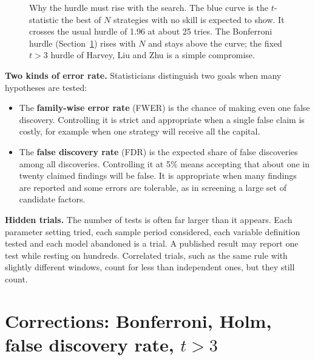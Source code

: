 \begin{figure}[htbp]
  \caption{Why the hurdle must rise with the search. The blue curve is the
    $t$-statistic the best of $N$ strategies with no skill is expected to show.
    It crosses the usual hurdle of 1.96 at about 25 tries. The Bonferroni
    hurdle (Section~\ref{sec:04-corrections}) rises with $N$ and stays above
    the curve; the fixed $t > 3$ hurdle of Harvey, Liu and Zhu is a simple
    compromise.}
  \label{fig:04-hurdles}
\end{figure}


\textbf{Two kinds of error rate.} Statisticians distinguish two goals when many hypotheses are tested:

\begin{itemize}
  \item The \textbf{family-wise error rate} (FWER) is the chance of making even one false discovery. Controlling it is strict and appropriate when a single false claim is costly, for example when one strategy will receive all the capital.
  \item The \textbf{false discovery rate} (FDR) is the expected share of false discoveries among all discoveries. Controlling it at 5\% means accepting that about one in twenty claimed findings will be false. It is appropriate when many findings are reported and some errors are tolerable, as in screening a large set of candidate factors.
\end{itemize}

\textbf{Hidden trials.} The number of tests is often far larger than it appears. Each parameter setting tried, each sample period considered, each variable definition tested and each model abandoned is a trial. A published result may report one test while resting on hundreds. Correlated trials, such as the same rule with slightly different windows, count for less than independent ones, but they still count.

\section{Corrections: Bonferroni, Holm, false discovery rate, $t > 3$}
\label{sec:04-corrections}

